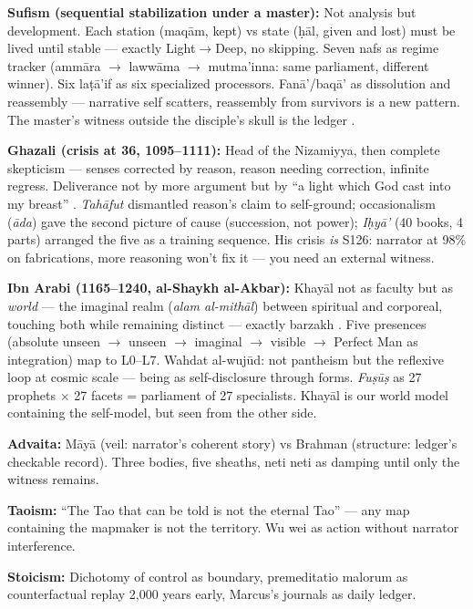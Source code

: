 \documentclass[11pt]{article}
\begin{document}
\textbf{Sufism (sequential stabilization under a master):} Not analysis but development. Each station (maq\=am, kept) vs state (\d{h}\=al, given and lost) must be lived until stable --- exactly Light$\to$Deep, no skipping. Seven nafs as regime tracker (amm\=ara $\to$ laww\=ama $\to$ mutma'inna: same parliament, different winner). Six la\d{t}\=a'if as six specialized processors. Fan\=a'/baq\=a' as dissolution and reassembly --- narrative self scatters, reassembly from survivors is a new pattern. The master's witness outside the disciple's skull is the ledger \citep{ghazali1106ihya,ibnarabi1238futuhat}.

\textbf{Ghazali (crisis at 36, 1095--1111):} Head of the Nizamiyya, then complete skepticism --- senses corrected by reason, reason needing correction, infinite regress. Deliverance not by more argument but by ``a light which God cast into my breast'' \citep{ghazali1111munqidh}. \emph{Tah\=afut} dismantled reason's claim to self-ground; occasionalism (\textquotesingle\textit{\=ada}) gave the second picture of cause (succession, not power); \emph{I\d{h}y\=a'} (40 books, 4 parts) arranged the five as a training sequence. His crisis \emph{is} S126: narrator at 98\% on fabrications, more reasoning won't fix it --- you need an external witness.

\textbf{Ibn Arabi (1165--1240, al-Shaykh al-Akbar):} Khay\=al not as faculty but as \emph{world} --- the imaginal realm (\textquotesingle\textit{alam al-mith\=al}) between spiritual and corporeal, touching both while remaining distinct --- exactly barzakh \citep{ibnarabi1229fusus,ibnarabi1238futuhat,chittick1984,hirtenstein1999}. Five presences (absolute unseen $\to$ unseen $\to$ imaginal $\to$ visible $\to$ Perfect Man as integration) map to L0--L7. Wahdat al-wuj\=ud: not pantheism but the reflexive loop at cosmic scale --- being as self-disclosure through forms. \emph{Fu\d{s}\=u\d{s}} as 27 prophets $\times$ 27 facets = parliament of 27 specialists. Khay\=al is our world model containing the self-model, but seen from the other side.

\textbf{Advaita:} M\=ay\=a (veil: narrator's coherent story) vs Brahman (structure: ledger's checkable record). Three bodies, five sheaths, neti neti as damping until only the witness remains.

\textbf{Taoism:} ``The Tao that can be told is not the eternal Tao'' --- any map containing the mapmaker is not the territory. Wu wei as action without narrator interference.

\textbf{Stoicism:} Dichotomy of control as boundary, premeditatio malorum as counterfactual replay 2,000 years early, Marcus's journals as daily ledger.
\end{document}
